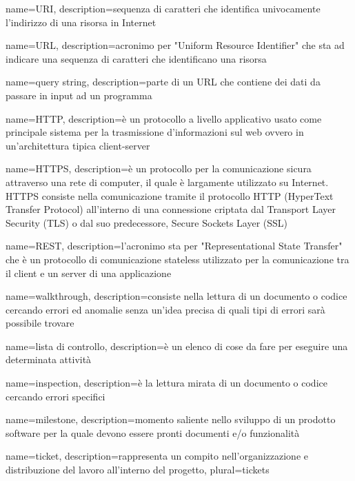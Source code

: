  {
    name=URI,
    description={sequenza di caratteri che identifica univocamente l'indirizzo di una risorsa in Internet}
}

 {
    name=URL,
    description={acronimo per "Uniform Resource Identifier" che sta ad indicare una sequenza di caratteri che identificano una risorsa}
}

 {
    name=query string,
    description={parte di un URL che contiene dei dati da passare in input ad un programma}
}

 {
    name=HTTP,
    description={è un protocollo a livello applicativo usato come principale sistema per la trasmissione d'informazioni sul web ovvero in un'architettura tipica client-server}
}

 {
    name=HTTPS,
    description={è un protocollo per la comunicazione sicura attraverso una rete di computer, il quale è largamente utilizzato su Internet. HTTPS consiste nella comunicazione tramite il protocollo HTTP (HyperText Transfer Protocol) all'interno di una connessione criptata dal Transport Layer Security (TLS) o dal suo predecessore, Secure Sockets Layer (SSL)}
}

 {
    name=REST,
    description={l'acronimo sta per "Representational State Transfer" che è un protocollo di comunicazione stateless utilizzato per la comunicazione tra il client e un server di una applicazione}
}

 {
	name=walkthrough,
    description={consiste nella lettura di un documento o codice cercando errori ed anomalie senza un'idea precisa di quali tipi di errori sarà possibile trovare}
}

 {
	name=lista di controllo,
	description={è un elenco di cose da fare per eseguire una determinata attività}
}

 {
	name=inspection,
	description={è la lettura mirata di un documento o codice cercando errori specifici}
}

 {
	name=milestone,
	description={momento saliente nello sviluppo di un prodotto software per la quale devono essere pronti documenti e/o funzionalità}
}

 {
	name=ticket,
	description={rappresenta un compito nell'organizzazione e distribuzione del lavoro all'interno del progetto},
	plural=tickets
}

